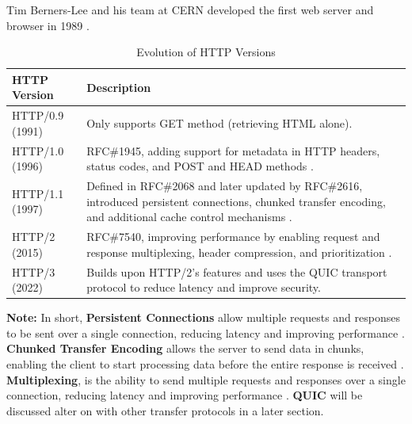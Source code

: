 \newpage
\noindent
Tim Berners-Lee and his team at CERN developed the first web server and browser in 1989 \cite{w3c_http_history}.

\begin{table}[h!]
    \centering
    \begin{tabular}{@{}p{3cm}p{10cm}@{}}
    \toprule
    \textbf{HTTP Version} & \textbf{Description} \\ \midrule
    HTTP/0.9 (1991)       & Only supports GET method (retrieving HTML alone). \\
    HTTP/1.0 (1996)       & RFC\#1945, adding support for metadata in HTTP headers, status codes, and POST and HEAD methods \cite{rfc1945}. \\
    HTTP/1.1 (1997)       & Defined in RFC\#2068 and later updated by RFC\#2616, introduced persistent connections, chunked transfer encoding, and additional cache control mechanisms \cite{rfc2068}\cite{rfc2616}. \\
    HTTP/2 (2015)         & RFC\#7540, improving performance by enabling request and response multiplexing, header compression, and prioritization \cite{rfc7540}. \\
    HTTP/3 (2022)         & Builds upon HTTP/2's features and uses the QUIC transport protocol to reduce latency and improve security. \cite{rfc9114} \\ \bottomrule
    \end{tabular}
    \caption{Evolution of HTTP Versions}    
    \label{tab:http_versions}
\end{table}

\begin{Note}
    \textbf{Note:} In short, \textbf{Persistent Connections} allow multiple requests and responses to be sent over a single connection, reducing latency and improving performance \cite{rfc2616}.
    \textbf{Chunked Transfer Encoding} allows the server to send data in chunks, enabling the client to start processing data before the entire response is received \cite{rfc2616}.
    \textbf{Multiplexing}, is the ability to send multiple requests and responses over a single connection, reducing latency and improving performance \cite{multiplexing_networkencyclopedia}. 
     \textbf{QUIC} will be discussed alter on with other transfer protocols in a later section.

\end{Note}

